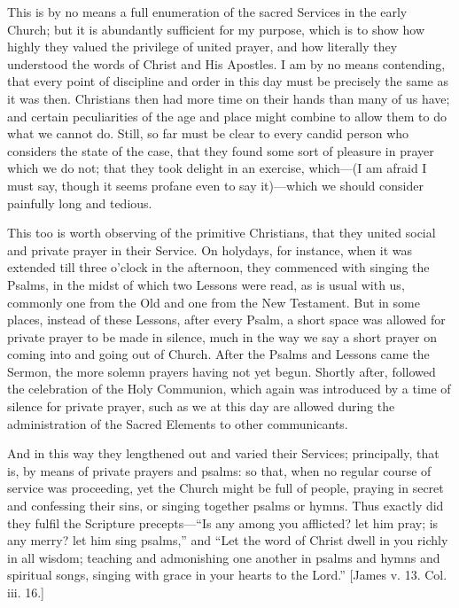 This is by no means a full enumeration of the sacred Services in
the early Church; but it is abundantly sufficient for my purpose,
which is to show how highly they valued the privilege of united
prayer, and how literally they understood the words of Christ and His
Apostles. I am by no means contending, that every point of discipline
and order in this day must be precisely the same as it was then.
Christians then had more time on their hands than many of us have; and
certain peculiarities of the age and place might combine to allow them
to do what we cannot do. Still, so far must be clear to every candid
person who considers the state of the case, that they found some sort
of pleasure in prayer which we do not; that they took delight in an
exercise, which—(I am afraid I must say, though it seems profane
even to say it)—which we should consider painfully long and tedious.

This too is worth observing of the primitive Christians, that they
united social and private prayer in their Service. On holydays, for
instance, when it was extended till three o'clock in the afternoon,
they commenced with singing the Psalms, in the midst of which two
Lessons were read, as is usual with us, commonly one from the Old and
one from the New Testament. But in some places, instead of these
Lessons, after every Psalm, a short space was allowed for private
prayer to be made in silence, much in the way we say a short prayer on
coming into and going out of Church. After the Psalms and Lessons came
the Sermon, the more solemn prayers having not yet begun. Shortly
after, followed the celebration of the Holy Communion, which again was
introduced by a time of silence for private prayer, such as we at this
day are allowed during the administration of the Sacred Elements to
other communicants.

And in this way they lengthened out and varied their Services;
principally, that is, by means of private prayers and psalms: so that,
when no regular course of service was proceeding, yet the Church might
be full of people, praying in secret and confessing their sins, or
singing together psalms or hymns. Thus exactly did they fulfil the
Scripture precepts—``Is any among you afflicted? let him pray;
is any merry? let him sing psalms,'' and ``Let the word of
Christ dwell in you richly in all wisdom; teaching and admonishing one
another in psalms and hymns and spiritual songs, singing with grace in
your hearts to the Lord.'' [James v. 13. Col. iii. 16.]

